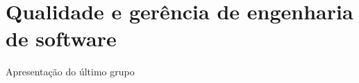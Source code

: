 \chapter{Qualidade e gerência de engenharia de software}
\label{cap:qualigerencia}

Apresentação do último grupo